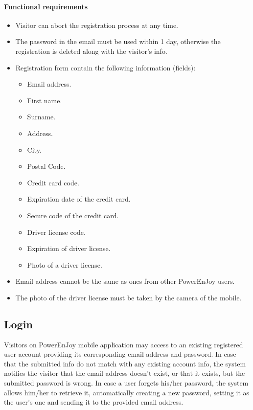 \paragraph{Functional requirements}
\begin{itemize}
	\item Visitor can abort the registration process at any time.
	\item The password in the email must be used within 1 day, otherwise the registration is deleted along with the visitor's info.
	\item Registration form contain the following information (fields):
	\begin{itemize}
		\item Email address.
		\item First name.
		\item Surname.
		\item Address.
		\item City.
		\item Postal Code.
		\item Credit card code.
		\item Expiration date of the credit card.
		\item Secure code of the credit card.
		\item Driver license code.
		\item Expiration of driver license.
		\item Photo of a driver license.
	\end{itemize}
	\item Email address cannot be the same as ones from other PowerEnJoy users.
	\item The photo of the driver license must be taken by the camera of the mobile.
\end{itemize}
\newpage

\subsection{Login}
Visitors on PowerEnJoy mobile application may access to an existing registered user account providing its corresponding email address and password. In case that the submitted info do not match with any existing account info, the system notifies the visitor that the email address doesn't exist, or that it exists, but the submitted password is wrong. In case a user forgets his/her password, the system allows him/her to retrieve it, automatically creating a new password, setting it as the user's one and sending it to the provided email address.
